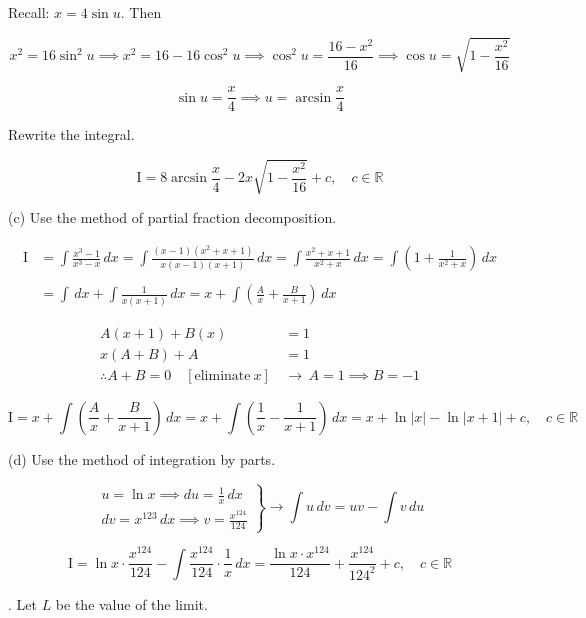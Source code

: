 \documentclass{article}
\begin{document}
\hfill

\noindent Recall: $x=4\sin u$. Then

\[x^2=16\sin^2u\implies x^2=16-16\cos^2u\implies\cos^2u=\frac{16-x^2}{16}\implies\cos u=\sqrt{1-\frac{x^2}{16}}\]

\[\sin u=\frac{x}4\implies u=\arcsin\frac x4\]

\hfill

\noindent Rewrite the integral.

\[\mathrm{I}=\boxed{8\arcsin\frac x4-2x\sqrt{1-\frac{x^2}{16}}+c,\quad c\in\mathbb{R}}\]

\newpage

\noindent (c) Use the method of partial fraction decomposition.

\begin{align*}
\mathrm{I}&=\int\frac{x^3-1}{x^3-x}\,dx=\int\frac{(x-1)\left(x^2+x+1\right)}{x(x-1)(x+1)}\,dx=\int\frac{x^2+x+1}{x^2+x}\,dx=\int\left(1+\frac1{x^2+x}\right)\,dx\\\\&=\int\,dx+\int\frac1{x(x+1)}\,dx=x+\int\left(\frac A{x}+\frac B{x+1}\right)\,dx
\end{align*}

\begin{align*}
A(x+1)+B(x)&=1\\
x(A+B)+A&=1\\
\therefore A+B=0\quad[\text{eliminate}\:x]\,&\rightarrow\,A=1\implies B=-1
\end{align*}

\[\mathrm{I}=x+\int\left(\frac Ax+\frac B{x+1}\right)\,dx=x+\int\left(\frac1x-\frac1{x+1}\right)\,dx=\boxed{x+\ln\left|x\right|-\ln\left|x+1\right|+c,\quad c\in\mathbb{R}}\]

\hfill

\noindent (d) Use the method of integration by parts.

\[\left.\begin{array}{c}
\displaystyle u=\ln x\implies du=\frac1x\,dx\\[1em]
\displaystyle dv=x^{123}\,dx\implies v=\frac{x^{124}}{124}
\end{array}\right\}\rightarrow\int u\,dv=uv-\int v\,du\]

\[\mathrm{I}=\ln x\cdot\frac{x^{124}}{124}-\int\frac{x^{124}}{124}\cdot\frac1x\,dx=\boxed{\frac{\ln x\cdot x^{124}}{124}+\frac{x^{124}}{124^2}+c,\quad c\in\mathbb{R}}\]

\hfill

. Let $L$ be the value of the limit.
\end{document}
